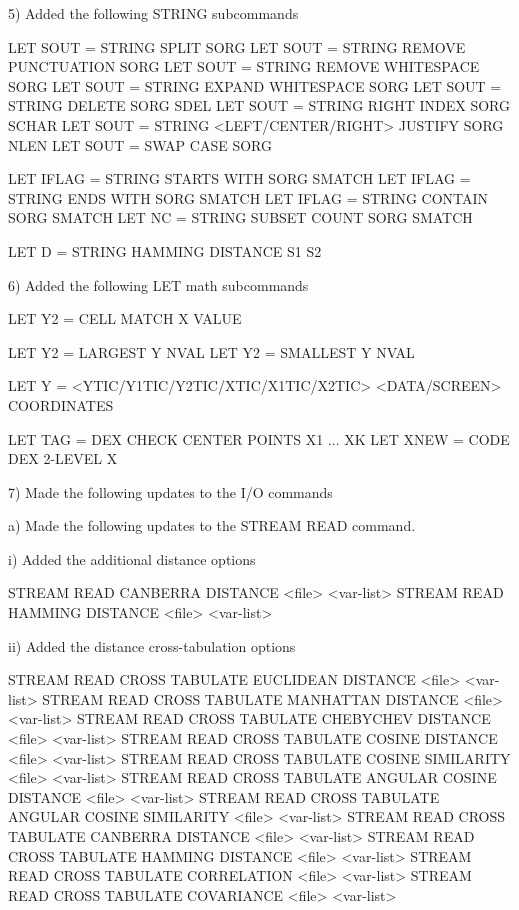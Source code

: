  5) Added the following STRING subcommands

      LET SOUT = STRING SPLIT SORG
      LET SOUT = STRING REMOVE PUNCTUATION SORG
      LET SOUT = STRING REMOVE WHITESPACE SORG
      LET SOUT = STRING EXPAND WHITESPACE SORG
      LET SOUT = STRING DELETE SORG SDEL
      LET SOUT = STRING RIGHT INDEX SORG  SCHAR
      LET SOUT = STRING <LEFT/CENTER/RIGHT> JUSTIFY SORG NLEN
      LET SOUT = SWAP CASE SORG

      LET IFLAG = STRING STARTS WITH SORG SMATCH
      LET IFLAG = STRING ENDS   WITH SORG SMATCH
      LET IFLAG = STRING CONTAIN SORG SMATCH
      LET NC    = STRING SUBSET COUNT SORG SMATCH

      LET D = STRING HAMMING DISTANCE S1 S2

 6) Added the following LET math subcommands

      LET Y2 = CELL MATCH X VALUE

      LET Y2 = LARGEST Y NVAL
      LET Y2 = SMALLEST Y NVAL

      LET Y = <YTIC/Y1TIC/Y2TIC/XTIC/X1TIC/X2TIC>  <DATA/SCREEN> COORDINATES

      LET TAG = DEX CHECK CENTER POINTS X1 ... XK
      LET XNEW = CODE DEX 2-LEVEL X

 7) Made the following updates to the I/O commands

    a) Made the following updates to the STREAM READ command.

         i) Added the additional distance options

               STREAM READ CANBERRA DISTANCE <file>  <var-list>
               STREAM READ HAMMING DISTANCE <file>  <var-list>

        ii) Added the distance cross-tabulation options

               STREAM READ CROSS TABULATE EUCLIDEAN DISTANCE <file>  <var-list>
               STREAM READ CROSS TABULATE MANHATTAN DISTANCE <file> <var-list>
               STREAM READ CROSS TABULATE CHEBYCHEV DISTANCE <file> <var-list>
               STREAM READ CROSS TABULATE COSINE DISTANCE <file> <var-list>
               STREAM READ CROSS TABULATE COSINE SIMILARITY <file> <var-list>
               STREAM READ CROSS TABULATE ANGULAR COSINE DISTANCE <file> <var-list>
               STREAM READ CROSS TABULATE ANGULAR COSINE SIMILARITY <file> <var-list>
               STREAM READ CROSS TABULATE CANBERRA DISTANCE <file> <var-list>
               STREAM READ CROSS TABULATE HAMMING DISTANCE <file> <var-list>
               STREAM READ CROSS TABULATE CORRELATION <file>  <var-list>
               STREAM READ CROSS TABULATE COVARIANCE <file>  <var-list>

